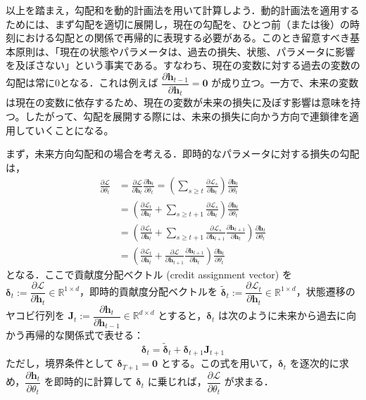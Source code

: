 \documentclass[titlepage]{ltjsbook}
\begin{document}
以上を踏まえ，勾配和を動的計画法を用いて計算しよう．動的計画法を適用するためには、まず勾配を適切に展開し，現在の勾配を、ひとつ前（または後）の時刻における勾配との関係で再帰的に表現する必要がある。このとき留意すべき基本原則は、「現在の状態やパラメータは、過去の損失、状態、パラメータに影響を及ぼさない」という事実である。すなわち、現在の変数に対する過去の変数の勾配は常に0となる．これは例えば $\dfrac{\partial \mathbf{h}_{t-1}}{\partial \mathbf{h}_t}=\mathbf{0}$ が成り立つ。一方で、未来の変数は現在の変数に依存するため、現在の変数が未来の損失に及ぼす影響は意味を持つ。したがって、勾配を展開する際には、未来の損失に向かう方向で連鎖律を適用していくことになる。

まず，未来方向勾配和の場合を考える．即時的なパラメータに対する損失の勾配は，
\begin{align}
\frac{\partial \mathcal{L}}{\partial \theta_t}&=\frac{\partial \mathcal{L}}{\partial \mathbf{h}_t}\frac{\partial \mathbf{h}_t}{\partial \theta_t}=\left(\sum_{s \geq t} \frac{\partial \mathcal{L}_s}{\partial \mathbf{h}_t} \right)\frac{\partial \mathbf{h}_t}{\partial \theta_t}\\
&=\left(\frac{\partial \mathcal{L}_t}{\partial \mathbf{h}_t} + \sum_{s \geq t+1} \frac{\partial \mathcal{L}_s}{\partial \mathbf{h}_t} \right)\frac{\partial \mathbf{h}_t}{\partial \theta_t}\\
&=\left(\frac{\partial \mathcal{L}_t}{\partial \mathbf{h}_t} + \sum_{s \geq t+1} \frac{\partial \mathcal{L}_s}{\partial \mathbf{h}_{t+1}}\frac{\partial \mathbf{h}_{t+1}}{\partial \mathbf{h}_t} \right)\frac{\partial \mathbf{h}_t}{\partial \theta_t}\\
&=\left(\frac{\partial \mathcal{L}_t}{\partial \mathbf{h}_t} + \frac{\partial \mathcal{L}}{\partial \mathbf{h}_{t+1}}\frac{\partial \mathbf{h}_{t+1}}{\partial \mathbf{h}_t} \right)\frac{\partial \mathbf{h}_t}{\partial \theta_t}
\end{align}
となる．ここで貢献度分配ベクトル (credit assignment vector) を $\boldsymbol{\delta}_t := \dfrac{\partial \mathcal{L}}{\partial \mathbf{h}_t} \in \mathbb{R}^{1\times d}$，即時的貢献度分配ベクトルを $\tilde{\boldsymbol{\delta}}_t := \dfrac{\partial \mathcal{L}_t}{\partial \mathbf{h}_t} \in \mathbb{R}^{1\times d}$，状態遷移のヤコビ行列を $\mathbf{J}_t := \dfrac{\partial \mathbf{h}_{t}}{\partial \mathbf{h}_{t-1}} \in \mathbb{R}^{d\times d}$ とすると，$\boldsymbol{\delta}_t$ は次のように未来から過去に向かう再帰的な関係式で表せる：
\begin{equation}
\boldsymbol{\delta}_t=\tilde{\boldsymbol{\delta}}_t + \boldsymbol{\delta}_{t+1}\mathbf{J}_{t+1}
\end{equation}
ただし，境界条件として $\boldsymbol{\delta}_{T+1}=\mathbf{0}$ とする。この式を用いて，$\boldsymbol{\delta}_t$ を逐次的に求め，$\dfrac{\partial \mathbf{h}_t}{\partial \theta_t}$ を即時的に計算して $\boldsymbol{\delta}_t$ に乗じれば，$\dfrac{\partial \mathcal{L}}{\partial \theta_t}$ が求まる．
\end{document}
